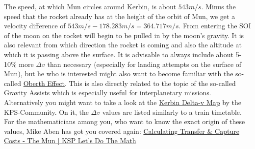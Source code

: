 \documentclass[12pt,paper=A4,numbers=noenddot,bibliography=totoc,listof=totoc,DIV=11,BCOR=1mm]{scrreprt}
\begin{document}
\begin{enumerate}
The speed, at which Mun circles around Kerbin, is about $543m/s$.
Minus the speed that the rocket already has at the height of the orbit of Mun, we get a velocity difference of $543m/s - 178.283m/s = 364.717m/s$.
From entering the SOI of the moon on the rocket will begin to be pulled in by the moon's gravity. It is also relevant from which direction the rocket is coming and also the altitude at which it is passing  above the surface. It is advisable to always include about 5-10\% more $\Delta v$ than necessary (especially for landing attempts on the surface of Mun), but he who is interested might also want to become familiar with the so-called \href{https://youtu.be/ouJiNZ1pUv8}{Oberth Effect}. This is also directly related to the topic of the so-called \href{https://youtu.be/16jr7WWGSxo}{Gravity Assists} which is especially useful for interplanetary missions.\\
Alternatively you might want to take a look at the \href{https://wiki.kerbalspaceprogram.com/wiki/File:KerbinDeltaVMap.png}{Kerbin Delta-v Map} by the KPS-Community. On it, the $\Delta v$ values are listed similarly to a train timetable. For the mathematicians among you, who want to know the exact origin of these values, Mike Aben has got you covered again: \href{https://youtu.be/rRP5doigXSM}{Calculating Transfer \& Capture Costs - The Mun | KSP Let's Do The Math}\\


\end{enumerate}
\end{document}
